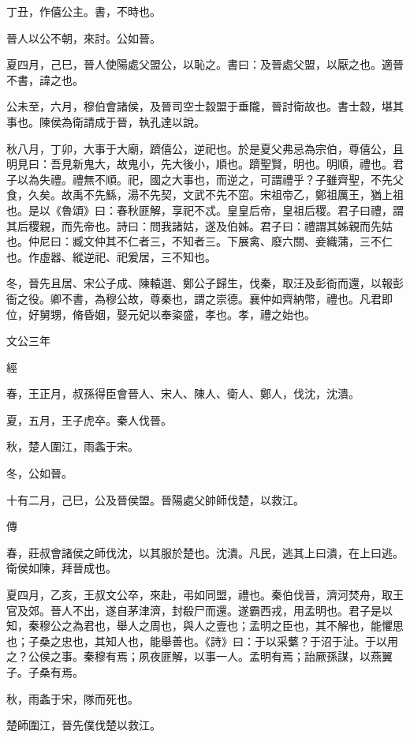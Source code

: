 \documentclass{ctexart}
\begin{document}
丁丑，作僖公主。書，不時也。

晉人以公不朝，來討。公如晉。

夏四月，己巳，晉人使陽處父盟公，以恥之。書曰：及晉處父盟，以厭之也。適晉不書，諱之也。

公未至，六月，穆伯會諸侯，及晉司空士縠盟于垂隴，晉討衛故也。書士縠，堪其事也。陳侯為衛請成于晉，執孔達以說。

秋八月，丁卯，大事于大廟，躋僖公，逆祀也。於是夏父弗忌為宗伯，尊僖公，且明見曰：吾見新鬼大，故鬼小，先大後小，順也。躋聖賢，明也。明順，禮也。君子以為失禮。禮無不順。祀，國之大事也，而逆之，可謂禮乎？子雖齊聖，不先父食，久矣。故禹不先鯀，湯不先契，文武不先不窋。宋祖帝乙，鄭祖厲王，猶上祖也。是以《魯頌》曰：春秋匪解，享祀不忒。皇皇后帝，皇祖后稷。君子曰禮，謂其后稷親，而先帝也。詩曰：問我諸姑，遂及伯姊。君子曰：禮謂其姊親而先姑也。仲尼曰：臧文仲其不仁者三，不知者三。下展禽、廢六關、妾織蒲，三不仁也。作虛器、縱逆祀、祀爰居，三不知也。

冬，晉先且居、宋公子成、陳轅選、鄭公子歸生，伐秦，取汪及彭衙而還，以報彭衙之役。卿不書，為穆公故，尊秦也，謂之崇德。襄仲如齊納幣，禮也。凡君即位，好舅甥，脩昏姻，娶元妃以奉粢盛，孝也。孝，禮之始也。





文公三年


經



春，王正月，叔孫得臣會晉人、宋人、陳人、衛人、鄭人，伐沈，沈潰。

夏，五月，王子虎卒。秦人伐晉。

秋，楚人圍江，雨螽于宋。

冬，公如晉。

十有二月，己巳，公及晉侯盟。晉陽處父帥師伐楚，以救江。

傳



春，莊叔會諸侯之師伐沈，以其服於楚也。沈潰。凡民，逃其上曰潰，在上曰逃。衛侯如陳，拜晉成也。

夏四月，乙亥，王叔文公卒，來赴，弔如同盟，禮也。秦伯伐晉，濟河焚舟，取王官及郊。晉人不出，遂自茅津濟，封殽尸而還。遂霸西戎，用孟明也。君子是以知，秦穆公之為君也，舉人之周也，與人之壹也；孟明之臣也，其不解也，能懼思也；子桑之忠也，其知人也，能舉善也。《詩》曰：于以采蘩？于沼于沚。于以用之？公侯之事。秦穆有焉；夙夜匪解，以事一人。孟明有焉；詒厥孫謀，以燕翼子。子桑有焉。

秋，雨螽于宋，隊而死也。

楚師圍江，晉先僕伐楚以救江。
\end{document}
